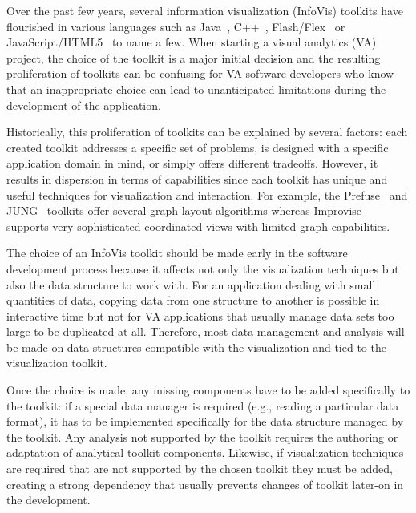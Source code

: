 
Over the past few years, several information visualization (InfoVis)
toolkits have flourished in various languages such as
Java~\cite{Discovery2,InfoVis, Prefuse, jung2003, Improvise},
C++~\cite{Tulip,ADVIZOR}, Flash/Flex~\cite{Axiis,flare} or
JavaScript/HTML5~\cite{thejit,Protovis} to name a few.  When starting
a visual analytics (VA) project, the choice of the toolkit is a major
initial decision and the resulting proliferation of toolkits can be confusing
for VA software developers who know that an
inappropriate choice can lead to unanticipated limitations during the
development of the application.

Historically, this proliferation of toolkits can be explained by
several factors: each created toolkit addresses a specific set of
problems, is designed with a specific application domain in mind, or
simply offers different tradeoffs.  However, it results in dispersion
in terms of capabilities since each toolkit has unique and useful
techniques for visualization and interaction.  For example, the
Prefuse~\cite{Prefuse} and JUNG~\cite{jung2003} toolkits offer several
graph layout algorithms whereas Improvise~\cite{Improvise} supports
very sophisticated coordinated views with limited graph capabilities.

The choice of an InfoVis toolkit should be made
early in the software development process because it affects not only the visualization techniques but
also the data structure to work with.  For an application dealing with
small quantities of data, copying data from one structure to another
is possible in interactive time but not for VA
applications that usually manage data sets too large to be duplicated
at all.  Therefore, most data-management and analysis will be made on
data structures compatible with the visualization and tied to the
visualization toolkit.


Once the choice is made, any missing components have to be added
specifically to the toolkit: if a special data manager is required
(e.g., reading a particular data format), it has to be implemented
specifically for the data structure managed by the toolkit. Any analysis
not supported by the toolkit requires the authoring or adaptation of
analytical toolkit components. Likewise, if visualization techniques
are required that are not supported by the chosen toolkit they must
be added, creating a strong dependency that usually prevents changes
of toolkit later-on in the development.

